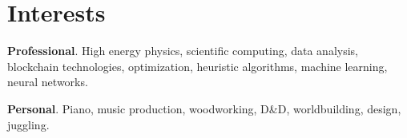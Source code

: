 \documentclass[a4paper]{cv-style}
\begin{document}
\section{Interests}
    \vspace{-0.2cm}

    \textbf{Professional}. High energy physics, scientific computing, data analysis, blockchain technologies, optimization, heuristic algorithms, machine learning, neural networks.

    \textbf{Personal}. Piano, music production, woodworking, D\&D, worldbuilding, design, juggling.

\end{document}
